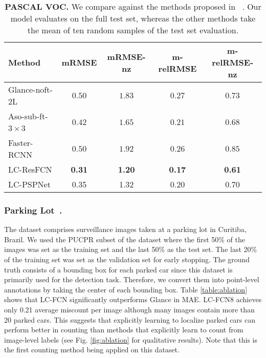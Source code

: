 \documentclass[runningheads]{llncs}
\begin{document}
\begin{table}
\centering
\caption{{\bf PASCAL VOC.} We compare against the methods proposed in ~\cite{chattopadhyay2016counting}. Our model evaluates on the full test set, whereas the other methods take the mean of ten random samples of the test set evaluation.}

\begin{tabular}{l|c|c|c|c}
  \bf Method & \bf mRMSE & \bf mRMSE-nz & \bf m-relRMSE & \bf {\small m-relRMSE-nz}\\ \hline\hline
  Glance-noft-2L~\cite{chattopadhyay2016counting}& $0.50 $& $1.83 $ & $0.27 $ & $0.73$\\ \hline
   Aso-sub-ft-$3\times 3$~\cite{chattopadhyay2016counting} & $0.42$ & $1.65 $ & $0.21 $ & $0.68 $\\ \hline Faster-RCNN~\cite{chattopadhyay2016counting}& $0.50$ & $1.92$ & $0.26$&$0.85$\\
 \hline
 \hline
LC-ResFCN& {\bf 0.31} & {\bf 1.20}&{\bf 0.17}&   {\bf 0.61}\\ \hline
LC-PSPNet& 0.35 & 1.32 & 0.20&  0.70\\ \hline
\end{tabular}
\label{tab:pascal}
\end{table}


\subsubsection{Parking Lot~\cite{de2015pklot}.}
The dataset comprises surveillance images taken at a parking lot in Curitiba, Brazil. We used the PUCPR subset of the dataset where the first 50\% of the images was set as the training set and the last 50\% as the test set. The last 20\% of the training set was set as the validation set for early stopping. The ground truth consists of a bounding box for each parked car since this dataset is primarily used for the detection task. Therefore, we convert them into point-level annotations by taking the center of each bounding box. Table \ref{table:ablation} shows that LC-FCN significantly outperforms Glance in MAE. LC-FCN8 achieves only 0.21 average miscount per image although many images contain more than 20 parked cars. This suggests that explicitly learning to localize parked cars can perform better in counting than methods that explicitly learn to count from image-level labels (see Fig. \ref{fig:ablation} for qualitative results). Note that this is the first counting method being applied on this dataset.

\vspace{-.5cm}
\end{document}
